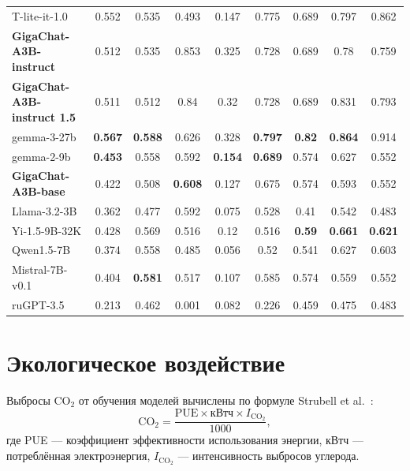 \begin{table}[H]
{\begin{tabular}{l|c|ccccccc}
        T-lite-it-1.0 & 0.552 & 0.535 & 0.493 & 0.147 & 0.775 & 0.689 & 0.797 & 0.862 \\
        \textbf{GigaChat-A3B-instruct} & 0.512 & 0.535 & 0.853 & 0.325 & 0.728 & 0.689 & 0.78 & 0.759 \\
        \textbf{GigaChat-A3B-instruct 1.5} & 0.511 & 0.512 & 0.84 & 0.32 & 0.728 & 0.689 & 0.831 & 0.793 \\
        gemma-3-27b & \textbf{0.567} & \textbf{0.588} & 0.626 & 0.328 & \textbf{0.797} & \textbf{0.82} & \textbf{0.864} & 0.914 \\
        \midrule
        gemma-2-9b & \textbf{0.453} & 0.558 & 0.592 & \textbf{0.154} & \textbf{0.689} & 0.574 & 0.627 & 0.552 \\
        \textbf{GigaChat-A3B-base} & 0.422 & 0.508 & \textbf{0.608} & 0.127 & 0.675 & 0.574 & 0.593 & 0.552 \\
        Llama-3.2-3B & 0.362 & 0.477 & 0.592 & 0.075 & 0.528 & 0.41 & 0.542 & 0.483 \\
        Yi-1.5-9B-32K & 0.428 & 0.569 & 0.516 & 0.12 & 0.516 & \textbf{0.59} & \textbf{0.661} & \textbf{0.621} \\
        Qwen1.5-7B & 0.374 & 0.558 & 0.485 & 0.056 & 0.52 & 0.541 & 0.627 & 0.603 \\
        Mistral-7B-v0.1 & 0.404 & \textbf{0.581} & 0.517 & 0.107 & 0.585 & 0.574 & 0.559 & 0.552 \\
        ruGPT-3.5 & 0.213 & 0.462 & 0.001 & 0.082 & 0.226 & 0.459 & 0.475 & 0.483 \\
        \bottomrule
    \end{tabular}%
    }
\end{table}

\section{Экологическое воздействие}\label{sec:gc_co2}

Выбросы CO$_2$ от обучения моделей вычислены по формуле Strubell et al.~\cite{strubell2019energy}:
\begin{equation}
\label{eq:co2}
    \text{CO}_2 = \frac{\text{PUE} \times \text{кВтч} \times I_{\text{CO}_2}}{1000},
\end{equation}
где PUE --- коэффициент эффективности использования энергии, кВтч --- потреблённая электроэнергия, $I_{\text{CO}_2}$ --- интенсивность выбросов углерода.

